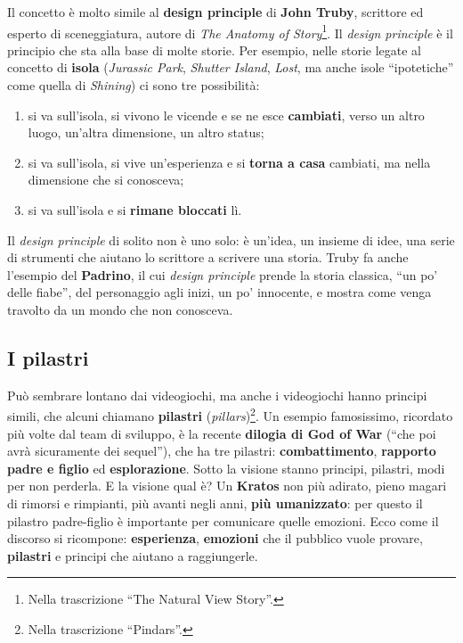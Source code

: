 Il concetto è molto simile al \textbf{design principle} di \textbf{John Truby},
scrittore ed esperto di sceneggiatura, autore di \emph{The Anatomy of
Story}\footnote{Nella trascrizione ``The Natural View Story''.}. Il
\emph{design principle} è il principio che sta alla base di molte storie. Per
esempio, nelle storie legate al concetto di \textbf{isola} (\emph{Jurassic
Park}, \emph{Shutter Island}, \emph{Lost}, ma anche isole ``ipotetiche'' come
quella di \emph{Shining}) ci sono tre possibilità:
\begin{enumerate}
  \item si va sull'isola, si vivono le vicende e se ne esce \textbf{cambiati},
        verso un altro luogo, un'altra dimensione, un altro status;
  \item si va sull'isola, si vive un'esperienza e si \textbf{torna a casa}
        cambiati, ma nella dimensione che si conosceva;
  \item si va sull'isola e si \textbf{rimane bloccati} lì.
\end{enumerate}
Il \emph{design principle} di solito non è uno solo: è un'idea, un insieme di
idee, una serie di strumenti che aiutano lo scrittore a scrivere una storia.
Truby fa anche l'esempio del \textbf{Padrino}, il cui \emph{design principle}
prende la storia classica, ``un po' delle fiabe'', del personaggio agli
inizi, un po' innocente, e mostra come venga travolto da un mondo che non
conosceva.

\subsection{I pilastri}

Può sembrare lontano dai videogiochi, ma anche i videogiochi hanno principi
simili, che alcuni chiamano \textbf{pilastri} (\emph{pillars})\footnote{Nella
trascrizione ``Pindars''.}. Un esempio famosissimo, ricordato più volte dal team
di sviluppo, è la recente \textbf{dilogia di God of War} (``che poi avrà
sicuramente dei sequel''), che ha tre pilastri: \textbf{combattimento},
\textbf{rapporto padre e figlio} ed \textbf{esplorazione}. Sotto la visione
stanno principi, pilastri, modi per non perderla. E la visione qual è? Un
\textbf{Kratos} non più adirato, pieno magari di rimorsi e rimpianti, più
avanti negli anni, \textbf{più umanizzato}: per questo il pilastro padre-figlio è
importante per comunicare quelle emozioni. Ecco come il discorso si ricompone:
\textbf{esperienza}, \textbf{emozioni} che il pubblico vuole provare,
\textbf{pilastri} e principi che aiutano a raggiungerle.

